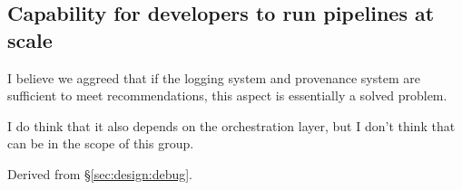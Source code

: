 \subsection{Capability for developers to run pipelines at scale}


I believe we aggreed that if the logging system and provenance system are sufficient to meet recommendations, this aspect is essentially a solved problem.

I do think that it also depends on the orchestration layer, but I don't think that can be in the scope of this group.

Derived from \S\ref{sec:design:debug}.
